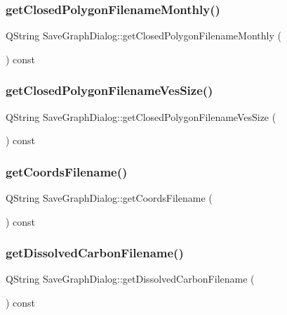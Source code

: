 \subsubsection{\texorpdfstring{getClosedPolygonFilenameMonthly()}{getClosedPolygonFilenameMonthly()}}
{\footnotesize\ttfamily Q\+String Save\+Graph\+Dialog\+::get\+Closed\+Polygon\+Filename\+Monthly (\begin{DoxyParamCaption}{ }\end{DoxyParamCaption}) const}

\mbox{\label{class_save_graph_dialog_a9c7547e29fe7178c6c78f391333ba007}} 
\subsubsection{\texorpdfstring{getClosedPolygonFilenameVesSize()}{getClosedPolygonFilenameVesSize()}}
{\footnotesize\ttfamily Q\+String Save\+Graph\+Dialog\+::get\+Closed\+Polygon\+Filename\+Ves\+Size (\begin{DoxyParamCaption}{ }\end{DoxyParamCaption}) const}

\mbox{\label{class_save_graph_dialog_a6ee8fa4a7185a91647d670f699ee010a}} 
\subsubsection{\texorpdfstring{getCoordsFilename()}{getCoordsFilename()}}
{\footnotesize\ttfamily Q\+String Save\+Graph\+Dialog\+::get\+Coords\+Filename (\begin{DoxyParamCaption}{ }\end{DoxyParamCaption}) const}

\mbox{\label{class_save_graph_dialog_aa6be5bf72cd23c8c21074d8fafdf26dd}} 
\subsubsection{\texorpdfstring{getDissolvedCarbonFilename()}{getDissolvedCarbonFilename()}}
{\footnotesize\ttfamily Q\+String Save\+Graph\+Dialog\+::get\+Dissolved\+Carbon\+Filename (\begin{DoxyParamCaption}{ }\end{DoxyParamCaption}) const}

